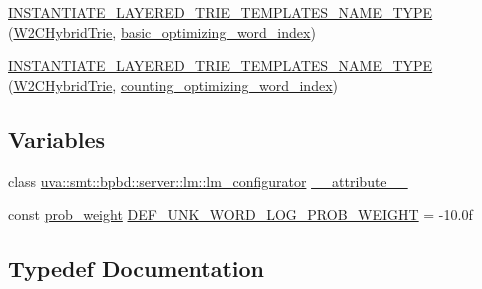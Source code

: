 \begin{DoxyCompactItemize}
\hyperlink{namespaceuva_1_1smt_1_1bpbd_1_1server_1_1lm_a7e1ab11b60a75813465799a5c1140da9}{I\+N\+S\+T\+A\+N\+T\+I\+A\+T\+E\+\_\+\+L\+A\+Y\+E\+R\+E\+D\+\_\+\+T\+R\+I\+E\+\_\+\+T\+E\+M\+P\+L\+A\+T\+E\+S\+\_\+\+N\+A\+M\+E\+\_\+\+T\+Y\+P\+E} (\hyperlink{classuva_1_1smt_1_1bpbd_1_1server_1_1lm_1_1_w2_c_hybrid_trie}{W2\+C\+Hybrid\+Trie}, \hyperlink{namespaceuva_1_1smt_1_1bpbd_1_1server_1_1lm_1_1dictionary_a3001583c904eec702b4a4125082a7ecd}{basic\+\_\+optimizing\+\_\+word\+\_\+index})
\item 
\hyperlink{namespaceuva_1_1smt_1_1bpbd_1_1server_1_1lm_aafd1ffb4ccc6c97ca373f027745f3257}{I\+N\+S\+T\+A\+N\+T\+I\+A\+T\+E\+\_\+\+L\+A\+Y\+E\+R\+E\+D\+\_\+\+T\+R\+I\+E\+\_\+\+T\+E\+M\+P\+L\+A\+T\+E\+S\+\_\+\+N\+A\+M\+E\+\_\+\+T\+Y\+P\+E} (\hyperlink{classuva_1_1smt_1_1bpbd_1_1server_1_1lm_1_1_w2_c_hybrid_trie}{W2\+C\+Hybrid\+Trie}, \hyperlink{namespaceuva_1_1smt_1_1bpbd_1_1server_1_1lm_1_1dictionary_a61cbd647b15de785ccf4cdd26661c366}{counting\+\_\+optimizing\+\_\+word\+\_\+index})
\end{DoxyCompactItemize}
\subsection*{Variables}
\begin{DoxyCompactItemize}
\item 
class \hyperlink{classuva_1_1smt_1_1bpbd_1_1server_1_1lm_1_1lm__configurator}{uva\+::smt\+::bpbd\+::server\+::lm\+::lm\+\_\+configurator} \hyperlink{namespaceuva_1_1smt_1_1bpbd_1_1server_1_1lm_a118bbc146a82483b1a6da28b43c5df06}{\+\_\+\+\_\+attribute\+\_\+\+\_\+}
\item 
const \hyperlink{namespaceuva_1_1smt_1_1bpbd_1_1server_a01e9ea4de9c226f4464862e84ff0bbcc}{prob\+\_\+weight} \hyperlink{namespaceuva_1_1smt_1_1bpbd_1_1server_1_1lm_a6de1c7e176aa41057187126069624cf7}{D\+E\+F\+\_\+\+U\+N\+K\+\_\+\+W\+O\+R\+D\+\_\+\+L\+O\+G\+\_\+\+P\+R\+O\+B\+\_\+\+W\+E\+I\+G\+H\+T} = -\/10.\+0f
\end{DoxyCompactItemize}


\subsection{Typedef Documentation}
\hypertarget{namespaceuva_1_1smt_1_1bpbd_1_1server_1_1lm_aef3a083c436191e635148561bb2192c6}{}
